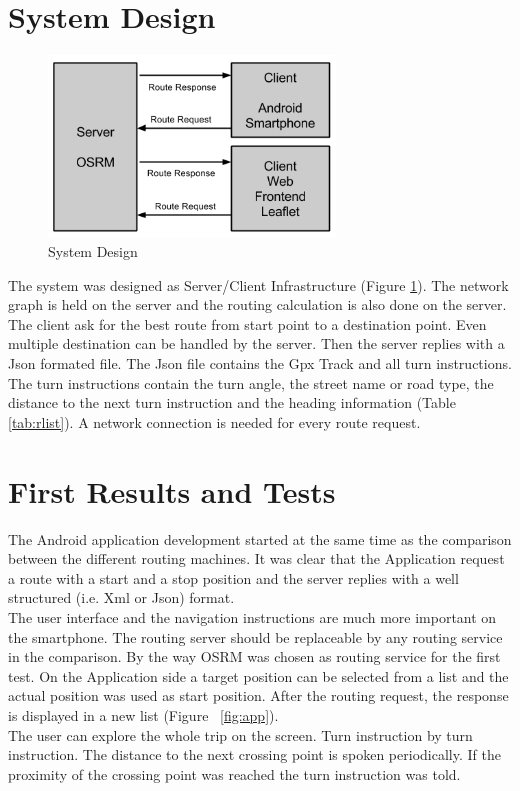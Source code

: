 \documentclass{sig-alternate}
\begin{document}
\section{System Design}

\begin{figure}
\centering
\includegraphics[width=3in]{System-Design2.png}
\caption{System Design}
\label{fig:sd}
\end{figure}
The system was designed as Server/Client Infrastructure (Figure \ref{fig:sd}). The network graph is held on the server and the routing calculation is also done on the server.  The client ask for the best route from start point to a destination point. Even multiple destination can be handled by the server. Then the server replies with a Json formated file. The Json file contains the Gpx Track and all turn instructions. The turn instructions contain the turn angle, the street name or road type, the distance to the next turn instruction and the heading information (Table \ref{tab:rlist}). A network connection is needed for every route request. 

\section{First Results and Tests}
The Android application development started at the same time as the comparison between the different routing machines. It was clear that the Application request a route with a start and a stop position and the server replies with a well structured (i.e. Xml or Json) format. \\
The user interface and the navigation instructions are much more important on the smartphone. The routing server should be replaceable by any routing service in the comparison. By the way OSRM was chosen as routing service for the first test. On the Application side a target position can be selected from a list and the actual position was used as start position. After the routing request, the response is displayed in a new list (Figure ~\ref{fig:app}). \\
The user can explore the whole trip on the screen. Turn instruction by turn instruction. The distance to the next crossing point is spoken periodically. If the proximity of the crossing point was reached the turn instruction was told. \\
\end{document}
